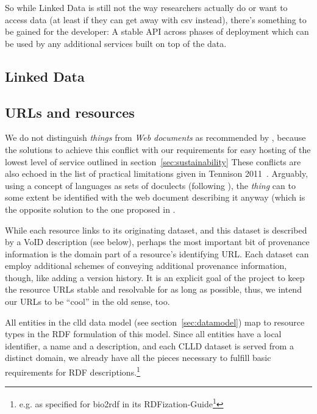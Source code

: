 \documentclass[a4paper,10pt]{article}
\begin{document}

So while Linked Data is still not the way researchers actually do or want to access data (at least if they can get away with csv instead),
there's something to be gained for the developer: A stable API across phases of deployment which can be used by any additional services
built on top of the data.


\subsection{Linked Data}

\subsection{URLs and resources}
We do not distinguish \emph{things} from \emph{Web documents} as recommended by ,
because the solutions to achieve this conflict with our requirements for easy hosting of the lowest level
of service outlined in section~\ref{sec:sustainability}
These conflicts are also echoed in the list of practical limitations given in Tennison 2011~\cite{tennison2011}.
Arguably, using a concept of languages as sets of doculects (following ), the \emph{thing} can
to some extent be identified with the web document describing it anyway
(which is the opposite solution to the one proposed in .

While each resource links to its originating
dataset, and this dataset is described by a VoID description (see below), perhaps the most important bit of provenance information is the domain part of 
a resource's identifying URL. Each dataset can employ additional schemes of conveying additional provenance information, though, like adding 
a version history.
It is an explicit goal of the project to keep the resource URLs stable and resolvable for as long as possible, thus, we intend our URLs to be ``cool'' in the old sense, too.

All entities in the clld data model (see section~\ref{sec:datamodel}) map to resource types in the RDF formulation of this model.
Since all entities have a local identifier, a name and a description, and each CLLD dataset is served from a distinct domain,
we already have all the pieces necessary to fulfill basic requirements for RDF descriptions.\footnote{e.g. as specified for bio2rdf in its
RDFization-Guide\footnote{https://github.com/bio2rdf/bio2rdf-scripts/wiki/RDFization-Guide}}
\end{document}
